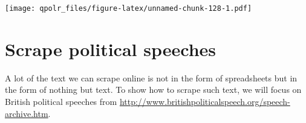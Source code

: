 \documentclass[12pt,oneside]{reedthesis}
\theoremstyle{definition}
\theoremstyle{definition}
\theoremstyle{definition}
\theoremstyle{remark}
\begin{document}
  \begin{Shaded}
  \begin{Highlighting}[]
  \NormalTok{(}\OperatorTok{+}
  \StringTok{  }\NormalTok{() }\OperatorTok{+}
  \StringTok{  }\NormalTok{() }\OperatorTok{+}
  \StringTok{  }\OperatorTok{::}\NormalTok{(}
      \NormalTok{(} \OperatorTok{>}\StringTok{ }\NormalTok{)),}
         \NormalTok{,}
        \NormalTok{,}
  \NormalTok{    ) }\OperatorTok{+}
  \StringTok{  }\NormalTok{(}
       \NormalTok{,}
       \NormalTok{,}
       
  \NormalTok{  )}
  \end{Highlighting}
  \end{Shaded}
  \texttt{[image: qpolr\_files/figure-latex/unnamed-chunk-128-1.pdf]}
  
  \section{Scrape political speeches}\label{scrape-political-speeches}
  
  A lot of the text we can scrape online is not in the form of
  spreadsheets but in the form of nothing but text. To show how to scrape
  such text, we will focus on British political speeches from
  \url{http://www.britishpoliticalspeech.org/speech-archive.htm}.
  
\end{document}
